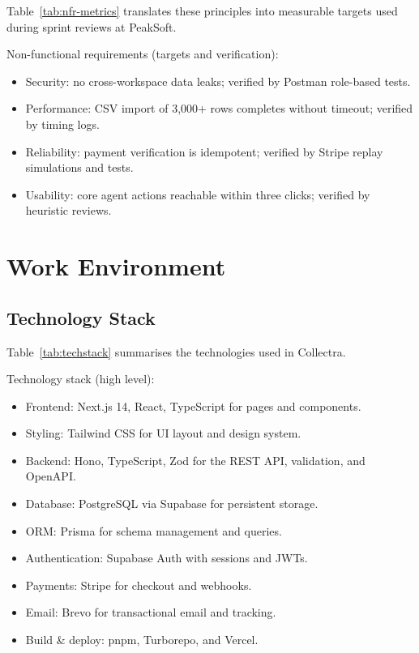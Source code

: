 ﻿\documentclass[12pt,a4paper]{report}
\begin{document}
Table~\ref{tab:nfr-metrics} translates these principles into measurable targets used during
sprint reviews at PeakSoft.

\noindent Non-functional requirements (targets and verification):

\begin{itemize}
  \item Security: no cross-workspace data leaks; verified by Postman role-based tests.
  \item Performance: CSV import of 3,000+ rows completes without timeout; verified by timing logs.
  \item Reliability: payment verification is idempotent; verified by Stripe replay simulations and tests.
  \item Usability: core agent actions reachable within three clicks; verified by heuristic reviews.
\end{itemize}

\section{Work Environment}

\subsection{Technology Stack}

Table~\ref{tab:techstack} summarises the technologies used in Collectra.

\noindent Technology stack (high level):

\begin{itemize}
  \item Frontend: Next.js 14, React, TypeScript for pages and components.
  \item Styling: Tailwind CSS for UI layout and design system.
  \item Backend: Hono, TypeScript, Zod for the REST API, validation, and OpenAPI.
  \item Database: PostgreSQL via Supabase for persistent storage.
  \item ORM: Prisma for schema management and queries.
  \item Authentication: Supabase Auth with sessions and JWTs.
  \item Payments: Stripe for checkout and webhooks.
  \item Email: Brevo for transactional email and tracking.
  \item Build \& deploy: pnpm, Turborepo, and Vercel.
\end{itemize}
\end{document}
